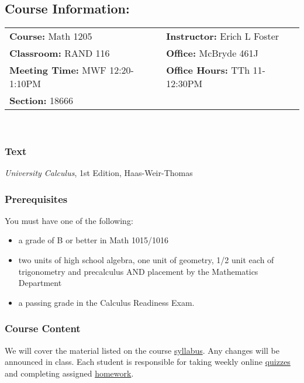 \documentclass{article}
\begin{document}
		\begin{centering}\subsection*{Course Information:}\end{centering}
		\begin{tabular}{ll}
				\textbf{Course:} Math 1205 &
				\textbf{Instructor:} Erich L Foster \\
				\textbf{Classroom:} RAND 116 & 
				\textbf{Office:} McBryde 461J \\
				\textbf{Meeting Time:} MWF 12:20-1:10PM &
				\textbf{Office Hours:} TTh 11-12:30PM \\
				\textbf{Section:} 18666
		\end{tabular} \\
			
			\subsubsection*{Text} 
			\emph{University Calculus}, 1st Edition, Haas-Weir-Thomas

			\subsubsection*{Prerequisites} 
			You must have one of the following: 
			\begin{itemize}
				\item   a grade of B or better in Math 1015/1016
				\item   two units of high school algebra, one unit of geometry,
					1/2 unit each of trigonometry and precalculus AND placement by
					the Mathematics Department
				\item   a passing grade in the Calculus Readiness Exam.
			\end{itemize} 
				
			\subsubsection*{Course Content} 
			We will cover the material listed on the course
			\href{http://www.emporium.vt.edu/math1205/resources/syllabus.html}{syllabus}.
			Any changes will be announced in class. Each student is responsible for
			taking weekly online
			\href{http://www.emporium.vt.edu/math1205/resources/quizzes}{quizzes} and
			completing assigned
			\href{http://www.math.vt.edu/people/erichlf/HWS11.html}{homework}.
\end{document}
